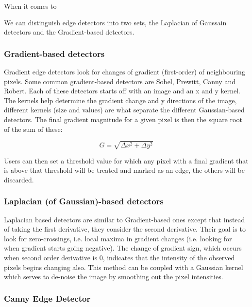 \documentclass[11pt]{report}
\begin{document}
When it comes to 

We can distinguish edge detectors into two sets, the Laplacian of Gaussain detectors
and the Gradient-based detectors.

\subsubsection*{Gradient-based detectors}
Gradient edge detectors look for changes of gradient (first-order) of 
neighbouring pixels. Some common gradient-based detectors are Sobel,
Prewitt, Canny and Robert. Each of these detectors starts off with an image
and an x and y kernel. The kernels help determine the gradient change
and y directions of the image, different kernels (size and values) are what
separate the different Gaussian-based detectors. The final gradient magnitude
for a given pixel is then the square root of the sum of these: 

\begin{equation}
	G = \sqrt{\Delta x^2 + \Delta y^2} 
\end{equation}

Users can then set a threshold value for which any pixel with a final
gradient that is above that threshold will be treated and marked as an edge,
the others will be discarded.

\subsubsection*{Laplacian (of Gaussian)-based detectors}
Laplacian based detectors are similar to Gradient-based ones except that 
instead of taking the first derivative, they consider the second derivative.
Their goal is to look for zero-crossings, i.e. local maxima in 
gradient changes (i.e. looking for when gradient starts going negative). The
change of gradient sign, which occurs when second order derivative is 0,
indicates that the intensity of the observed pixels begins changing also. This
method can be coupled with a Gaussian kernel which serves to de-noise the
image by smoothing out the pixel intensities. 


\subsubsection*{Canny Edge Detector}
\end{document}
